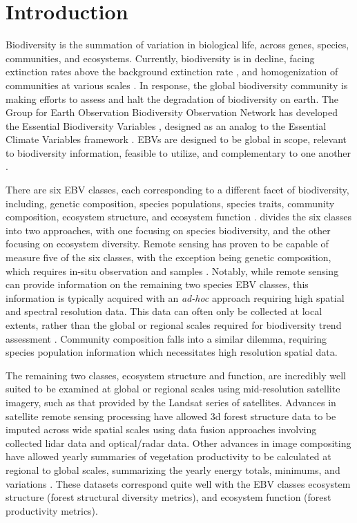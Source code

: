 \documentclass[
  authoryear,
  review,
  3p,
  twocolumn]{elsarticle}
\begin{document}
\hypertarget{introduction}{%
\section{Introduction}\label{introduction}}

Biodiversity is the summation of variation in biological life, across
genes, species, communities, and ecosystems. Currently, biodiversity is
in decline, facing extinction rates above the background extinction rate
\citep{thomas2004, urban2015}, and homogenization of communities at
various scales \citep{mcgill2015}. In response, the global biodiversity
community is making efforts to assess and halt the degradation of
biodiversity on earth. The Group for Earth Observation Biodiversity
Observation Network has developed the Essential Biodiversity Variables
\citep[EBVs,][]{pereira2013}, designed as an analog to the Essential
Climate Variables framework \citep{bojinski2014}. EBVs are designed to
be global in scope, relevant to biodiversity information, feasible to
utilize, and complementary to one another \citep{skidmore2021}.

There are six EBV classes, each corresponding to a different facet of
biodiversity, including, genetic composition, species populations,
species traits, community composition, ecosystem structure, and
ecosystem function \citep{pereira2013}. \citet{fernández2020} divides
the six classes into two approaches, with one focusing on species
biodiversity, and the other focusing on ecosystem diversity. Remote
sensing has proven to be capable of measure five of the six classes,
with the exception being genetic composition, which requires in-situ
observation and samples \citep{skidmore2021}. Notably, while remote
sensing can provide information on the remaining two species EBV
classes, this information is typically acquired with an \emph{ad-hoc}
approach requiring high spatial and spectral resolution data. This data
can often only be collected at local extents, rather than the global or
regional scales required for biodiversity trend assessment
\citep{valdez2023}. Community composition falls into a similar dilemma,
requiring species population information which necessitates high
resolution spatial data.

The remaining two classes, ecosystem structure and function, are
incredibly well suited to be examined at global or regional scales using
mid-resolution satellite imagery, such as that provided by the Landsat
series of satellites. Advances in satellite remote sensing processing
have allowed 3d forest structure data to be imputed across wide spatial
scales \citep{matasci2018, coops2021} using data fusion approaches
involving collected lidar data and optical/radar data. Other advances in
image compositing have allowed yearly summaries of vegetation
productivity to be calculated at regional to global scales, summarizing
the yearly energy totals, minimums, and variations \citep{radeloff2019}.
These datasets correspond quite well with the EBV classes ecosystem
structure (forest structural diversity metrics), and ecosystem function
(forest productivity metrics).
\end{document}
